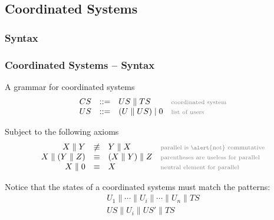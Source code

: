 \documentclass[presentation]{beamer}\mode<presentation>{\usetheme{AMSCesenaPurpleAndGold}}
\begin{document}
\subsection{Coordinated Systems}

\subsubsection{Syntax}

\begin{frame}
\frametitle{Coordinated Systems -- Syntax}

    \begin{block}{A grammar for coordinated systems}
        \[\begin{array}{rcll}
            CS &::=& US \parallel TS & \mathhint{coordinated system}\\
            US &::=& (U \parallel US) \mid 0 & \mathhint{list of users}
        \end{array}\]
    \end{block}
    
    \vfill
    
    \begin{block}{Subject to the following axioms}
        \[\begin{array}{rcll}
            X \parallel Y &\not\equiv& Y \parallel X & \mathhint{parallel is \alert{not} commutative} \\
            X \parallel (Y \parallel Z) &\equiv& (X \parallel  Y) \parallel Z & \mathhint{parentheses are useless for parallel} \\
            X \parallel 0 &\equiv& X & \mathhint{neutral element for parallel}
        \end{array}\]
    \end{block}
    
    \vfill
    
    \begin{block}{}
	    Notice that the states of a coordinated systems must match the patterns:
	    \[\begin{array}{c}
	        U_1 \parallel \cdots \parallel U_i \parallel \cdots \parallel U_n \parallel TS\\
	        US \parallel U_i \parallel US' \parallel TS
	 	\end{array}\]
    \end{block}
    
\end{frame}
\end{document}
